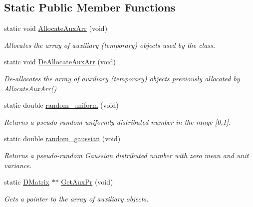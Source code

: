 \subsection*{Static Public Member Functions}
\begin{DoxyCompactItemize}
\item 
static void \hyperlink{classDMatrix_aadec35682639717d9bc698cfee3953ad}{AllocateAuxArr} (void)
\begin{DoxyCompactList}\small\item\em Allocates the array of auxiliary (temporary) objects used by the class. \item\end{DoxyCompactList}\item 
static void \hyperlink{classDMatrix_a6389bc3790f8b71dd59a8f2bd659fc27}{DeAllocateAuxArr} (void)
\begin{DoxyCompactList}\small\item\em De-\/allocates the array of auxiliary (temporary) objects previously allocated by \hyperlink{classDMatrix_aadec35682639717d9bc698cfee3953ad}{AllocateAuxArr()} \item\end{DoxyCompactList}\item 
static double \hyperlink{classDMatrix_a02bef7569ab47374e79f9acd9fa517b2}{random\_\-uniform} (void)
\begin{DoxyCompactList}\small\item\em Returns a pseudo-\/random uniformly distributed number in the range \mbox{[}0,1\mbox{]}. \item\end{DoxyCompactList}\item 
static double \hyperlink{classDMatrix_ac79a34758fce637c1f23149f267ed623}{random\_\-gaussian} (void)
\begin{DoxyCompactList}\small\item\em Returns a pseudo-\/random Gaussian distributed number with zero mean and unit variance. \item\end{DoxyCompactList}\item 
static \hyperlink{classDMatrix}{DMatrix} $\ast$$\ast$ \hyperlink{classDMatrix_adfa26d6b647b74af5f592d51bf70e8f4}{GetAuxPr} (void)
\begin{DoxyCompactList}\small\item\em Gets a pointer to the array of auxiliary objects. \item\end{DoxyCompactList}\item 
$$
\end{DoxyCompactItemize}
